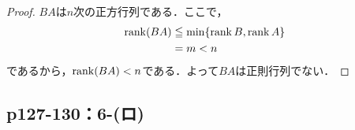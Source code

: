 \documentclass[a4paper,10pt,fleqn]{ltjsarticle}
\begin{document}
\begin{tleftbar}
    \begin{proof}
        $BA$は$n$次の正方行列である．ここで，
        \begin{align*}
            \rank (BA) & \leqq \min \{ \rank B, \rank A \} \\
                       & =  m <n
        \end{align*}
        であるから，$\rank (BA)<n$である．よって$BA$は正則行列でない．
    \end{proof}
\end{tleftbar}


\subsection*{p127-130：6-(ロ)}
\end{document}
